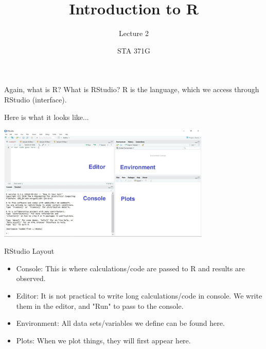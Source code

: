 \documentclass{beamer}\usepackage[]{graphicx}\usepackage[]{color}
\title{Introduction to R}
\subtitle{Lecture 2}
\author{STA 371G}
\begin{document}
  




  \frame{\maketitle}



  \begin{darkframes}
  
  
  
    \begin{frame}{Again, what is R? What is RStudio?}
    \fontsize{10}{10}\selectfont
     R is the language, which we access through RStudio (interface).\pause   
     
     \bigskip
     Here is what it looks like... 

      \begin{center}
        \includegraphics[width=4in]{RStudio}
      \end{center} 
    \end{frame}

    
    
    \begin{frame}{RStudio Layout}
    \fontsize{10}{10}\selectfont
      \begin{itemize}
        \item \alert{Console:} This is where calculations/code are passed to R and results are observed. \pause
        \item \alert{Editor:} It is not practical to write long calculations/code in console. We write them in the editor, and "Run" to pass to the console. \pause
        \item \alert{Environment:} All data sets/variables we define can be found here. \pause
        \item \alert{Plots:} When we plot things, they will first appear here.
      \end{itemize} 
    \end{frame}
    

\end{darkframes}
\end{document}
